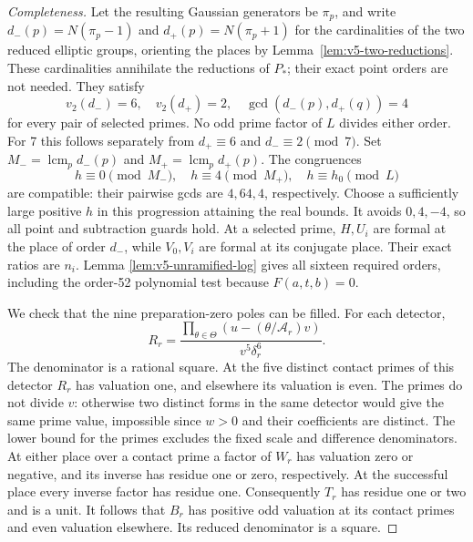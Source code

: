 \begin{proof}[Completeness]
Let the resulting Gaussian generators be $\pi_p$, and write
$d_-(p)=N(\pi_p-1)$ and $d_+(p)=N(\pi_p+1)$ for the cardinalities
of the two reduced elliptic groups, orienting the places by
Lemma~\ref{lem:v5-two-reductions}. These cardinalities annihilate
the reductions of $P_*$; their exact point orders are not needed.
They satisfy
\[
 v_2(d_-)=6,\quad v_2(d_+)=2,\quad
 \gcd(d_-(p),d_+(q))=4
\]
for every pair of selected primes. No odd prime factor of $L$
divides either order. For 7 this follows separately from
$d_+\equiv6$ and $d_-\equiv2\pmod7$.
Set $M_-=\operatorname{lcm}_p d_-(p)$ and
$M_+=\operatorname{lcm}_p d_+(p)$. The congruences
\[
 h\equiv0\pmod{M_-},\quad h\equiv4\pmod{M_+},\quad
 h\equiv h_0\pmod L
\]
are compatible: their pairwise gcds are $4,64,4$, respectively.
Choose a sufficiently large positive $h$ in this progression
attaining the real bounds. It avoids $0,4,-4$, so all point and
subtraction guards hold. At a selected prime, $H,U_i$ are formal
at the place of order $d_-$, while $V_0,V_i$ are formal at its
conjugate place. Their exact ratios are $n_i$. Lemma
\ref{lem:v5-unramified-log} gives all sixteen required orders,
including the order-52 polynomial test because $F(a,t,b)=0$.

We check that the nine preparation-zero poles can be filled.
For each detector,
\[
 R_r=\frac{\prod_{\theta\in\Theta}
                   (u-(\theta/\mathcal A_r)v)}
                 {v^5\delta_r^6}.
\]
The denominator is a rational square. At the five distinct contact
primes of this detector $R_r$ has valuation one, and elsewhere
its valuation is even. The primes do not divide $v$: otherwise
two distinct forms in the same detector would give the same
prime value, impossible since $w>0$ and their coefficients are
distinct. The lower bound for the primes excludes the fixed scale
and difference denominators. At either place over a
contact prime a factor of $W_r$ has valuation zero or negative,
and its inverse has residue one or zero, respectively. At the
successful place every inverse factor has residue one.
Consequently $T_r$ has residue one or two and is a unit.
It follows that $B_r$ has positive odd valuation at its contact
primes and even valuation elsewhere. Its reduced denominator is
a square.


\end{proof}
